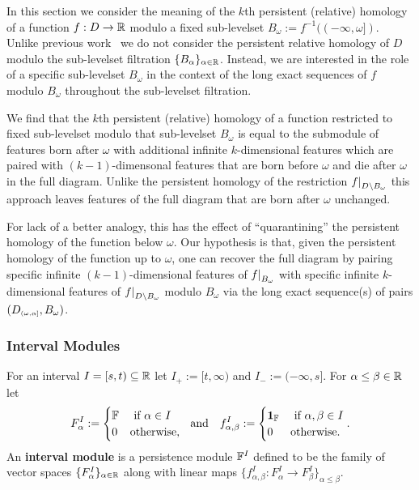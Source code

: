 
In this section we consider the meaning of the $k$th persistent (relative) homology of a function $f : D\to \mathbb{R}$ modulo a fixed sub-levelset $B_\omega := f^{-1}((-\infty,\omega])$.
Unlike previous work~\cite{extendedpersistence} we do not consider the persistent relative homology of $D$ modulo the sub-levelset filtration $\{B_\alpha\}_{\alpha\in\mathbb{R}}$.
Instead, we are interested in the role of a specific sub-levelset $B_\omega$ in the context of the long exact sequences of $f$ modulo $B_\omega$ throughout the sub-levelset filtration.

We find that the $k$th persistent (relative) homology of a function restricted to fixed sub-levelset modulo that sub-levelset $B_\omega$ is equal to the submodule of features born after $\omega$ with additional infinite $k$-dimensional features which are paired with $(k-1)$-dimensonal features that are born before $\omega$ and die after $\omega$ in the full diagram.
Unlike the persistent homology of the restriction $f\mathord{\mid}_{D\setminus B_\omega}$ this approach leaves features of the full diagram that are born after $\omega$ unchanged.

For lack of a better analogy, this has the effect of ``quarantining'' the persistent homology of the function below $\omega$.
Our hypothesis is that, given the persistent homology of the function up to $\omega$, one can recover the full diagram by pairing specific infinite $(k-1)$-dimensional features of $f\mathord{\mid}_{B_\omega}$ with specific infinite $k$-dimensional features of $f\mathord{\mid}_{D\setminus B_\omega}$ modulo $B_\omega$ via the long exact sequence(s) of pairs $(D_{\scriptscriptstyle (\omega,\alpha]}, B_\omega)$.

\subsubsection{Interval Modules}

For an interval $I = [s,t)\subseteq \mathbb{R}$ let $I_+ := [t,\infty)$ and $I_- := (-\infty, s]$.
For $\alpha\leq\beta\in\mathbb{R}$ let
\[ F_\alpha^I := \begin{cases} \FF&\text{ if } \alpha\in I\\ 0 &\text{otherwise,}\end{cases}\ \text{ and }\ \ f_{\alpha,\beta}^I := \begin{cases} \id_\FF&\text{ if } \alpha,\beta\in I\\ 0&\text{otherwise.}\end{cases}.\]
An \textbf{interval module} is a persistence module $\mathbb{F}^I$ defined to be the family of vector spaces $\{F_\alpha^I\}_{\alpha\in\mathbb{R}}$ along with linear maps $\{f_{\alpha,\beta}^I : F_\alpha^I\to F_\beta^I\}_{\alpha\leq\beta}$.

